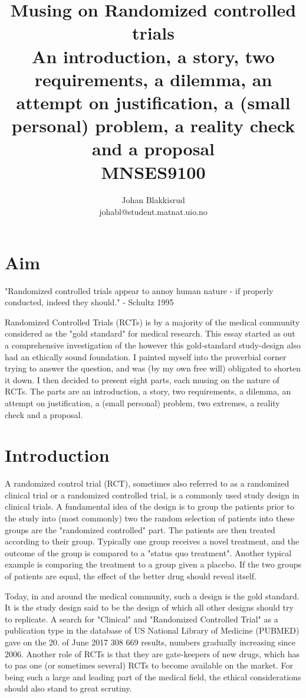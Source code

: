 \documentclass[12p]{article}
\title{Musing on Randomized controlled trials \\ 
    \large{An introduction, a story, two requirements, a dilemma, an attempt on justification, a (small personal) problem, a reality check and a proposal} \\
  \small{MNSES9100}
}
\author{Johan Blakkisrud \\ johabl@student.matnat.uio.no}
\begin{document}
\maketitle

\section*{Aim}

"Randomized controlled trials appear to annoy human nature - if properly conducted, indeed they should." - Schultz 1995

Randomized Controlled Trials (RCTs) is by a majority of the medical community considered as the "gold standard" for medical research.
This essay started as out a comprehensive investigation of the however this gold-standard study-design also had an ethically sound foundation.
I painted myself into the proverbial corner trying to answer the question, and was (by my own free will) obligated to shorten it down.
I then decided to present eight parts, each musing on the nature of RCTs.
The parts are an introduction, a story, two requirements, a dilemma, an attempt on justification, a (small personal) problem, two extremes, a reality check and a proposal.

\section*{Introduction}

A randomized control trial (RCT), sometimes also referred to as a randomized clinical trial or a randomized controlled trial, is a commonly used study design in clinical trials.
A fundamental idea of the design is to group the patients prior to the study into (most commonly) two the random selection of patients into these groups are the "randomized controlled" part.
The patients are then treated according to their group.
Typically one group receives a novel treatment, and the outcome of the group is compared to a "status quo treatment".
Another typical example is comparing the treatment to a group given a placebo. 
If the two groups of patients are equal, the effect of the better drug should reveal itself.

Today, in and around the medical community, such a design is the gold standard.
It is the study design said to be the design of which all other designs should try to replicate. 
A search for "Clinical" and "Randomized Controlled Trial" as a publication type in the database of US National Library of Medicine (PUBMED) gave on the 20. of June 2017 308 669 results, numbers gradually increasing since 2006.
Another role of RCTs is that they are gate-keepers of new drugs, which has to pas one (or sometimes several) RCTs to become available on the market. 
For being such a large and leading part of the medical field, the ethical considerations should also stand to great scrutiny.
\end{document}
